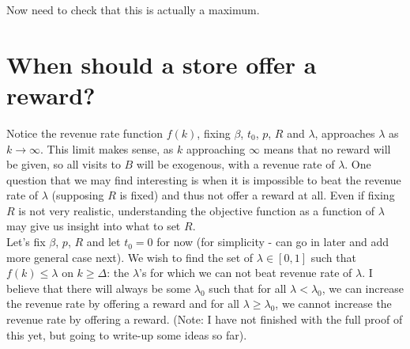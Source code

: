 Now need to check that this is actually a maximum.

\section{When should a store offer a reward?}

Notice the revenue rate function $f(k)$, fixing $\beta$, $t_0$, $p$, $R$ and $\lambda$, approaches $\lambda$ as $k \rightarrow \infty$. This limit makes sense, as $k$ approaching $\infty$ means that no reward will be given, so all visits to $B$ will be exogenous, with a revenue rate of $\lambda$. One question that we may find interesting is when it is impossible to beat the revenue rate of $\lambda$ (supposing $R$ is fixed) and thus not offer a reward at all. Even if fixing $R$ is not very realistic, understanding the objective function as a function of $\lambda$ may give us insight into what to set $R$. \\

Let's fix $\beta$, $p$, $R$ and let $t_0 = 0$ for now (for simplicity - can go in later and add more general case next). We wish to find the set of $\lambda \in [0,1]$ such that $f(k) \leq \lambda$ on $k \geq \Delta$: the $\lambda$'s for which we can not beat revenue rate of $\lambda$. I believe that there will always be some $\lambda_0$ such that for all $\lambda < \lambda_0$, we can increase the revenue rate by offering a reward and for all $\lambda \geq \lambda_0$, we cannot increase the revenue rate by offering a reward. (Note: I have not finished with the full proof of this yet, but going to write-up some ideas so far). \\

